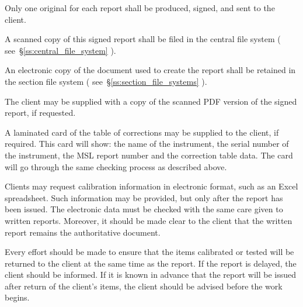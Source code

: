 
Only one original for each report shall be produced, signed, and sent to the client. 

A scanned copy of this signed report shall be filed in the central file system ( see~\S\ref{ss:central_file_system} ). 

An electronic copy of the document used to create the report shall be retained in the section file system ( see~\S\ref{ss:section_file_systems} ). 
   
The client may be supplied with a copy of the scanned PDF version of the signed report, if requested.

A laminated card of the table of corrections may be supplied to the client, if required.  This card will show: the name of the instrument, the serial number of the instrument, the MSL report number and the correction table data.  The card will go through the same checking process as described above.

Clients may request calibration information in electronic format, such as an Excel spreadsheet. Such information may be provided, but only after the report has been issued. The electronic data must be checked with the same care given to written reports. Moreover, it should be made clear to the client that the written report remains the authoritative document. 

Every effort should be made to ensure that the items calibrated or tested will be returned to the client at the same time as the report. If the report is delayed, the client should be informed. If it is known in advance that the report will be issued after return of the client’s items, the client should be advised before the work begins.


